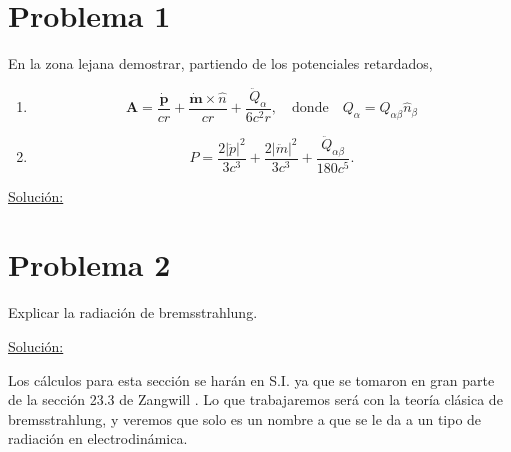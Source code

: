 \documentclass[a4paper,11pt]{article}
\numberwithin{equation}{section}
\renewcommand{\thefootnote}{\fnsymbol{footnote}}
\begin{document}

\fancyhead[R]{\thepage}

\setcounter{footnote}{0}
\renewcommand*{\thefootnote}{\arabic{footnote}}


\section{Problema 1}

En la zona lejana demostrar, partiendo de los potenciales retardados, 

\begin{enumerate}[label=\textbf{(\alph*)}]
 \item 
 
 $$
 \mathbf{A} = \frac{\dot{\mathbf{p}}}{cr} + \frac{\dot{\mathbf{m}} \times 
 \hat{n}}{cr} + \frac{\ddot{Q}_{\alpha}}{6c^2r}, \quad \text{donde} \quad
 Q_\alpha = Q_{\alpha\beta} \hat{n}_\beta
 $$
 
 \item 
 
 $$
 P = \frac{2|\ddot{p}|^2}{3c^3} + \frac{2|\ddot{m}|^2}{3c^3} +
 \frac{\ddot{Q}_{\alpha\beta}}{180c^5}.
 $$
\end{enumerate}

\underline{Solución:} \vspace{.3cm}

\section{Problema 2}

Explicar la radiación de bremsstrahlung.

\vspace{.3cm} \underline{Solución:} \vspace{.3cm}

Los cálculos para esta sección se harán en S.I. ya que se tomaron en gran parte
de la sección 23.3 de Zangwill \cite{zangwill}. Lo que trabajaremos será con 
la teoría clásica de bremsstrahlung, y veremos que solo es un nombre a que se 
le da a un tipo de radiación en electrodinámica.
\end{document}
